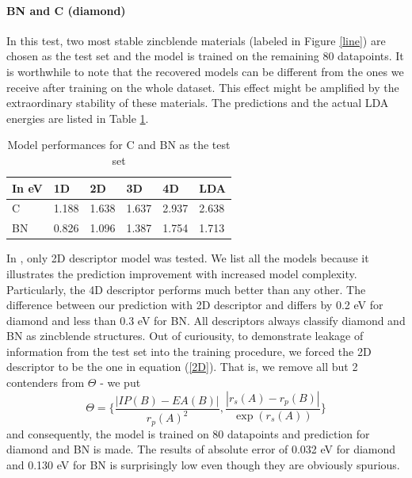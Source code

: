 \documentclass[11pt,oneside,czech,american]{book} %
\theoremstyle{definition} %
\theoremstyle{definition}
\begin{document}
\paragraph{BN and C (diamond)}
In this test, two most stable zincblende materials (labeled in Figure \ref{line}) are chosen as the test set and the model is trained on the remaining 80 datapoints. It is worthwhile to note that the recovered models can be different from the ones we receive after training on the whole dataset. This effect might be amplified by the extraordinary stability of these materials. The predictions and the actual LDA energies are listed in Table \ref{C_BN}.
\begin{table}[H]
	\centering
	\begin{tabular}{llllll} 
		\hline
		In eV & 1D    & 2D    & 3D    & 4D    & LDA    \\ 
		\hline
		C     & 1.188 & 1.638 & 1.637 & 2.937 & 2.638  \\ 		
		BN    & 0.826 & 1.096 & 1.387 & 1.754 & 1.713  \\
		\hline
	\end{tabular}
	\caption{Model performances for C and BN as the test set}
	\label{C_BN}
\end{table}
In \parencite{ghiringhelli17}, only 2D descriptor model was tested. We list all the models because it illustrates the prediction improvement with increased model complexity. Particularly, the 4D descriptor performs much better than any other. The difference between our prediction with 2D descriptor and \parencite{ghiringhelli17} differs by 0.2 eV for diamond and less than 0.3 eV for BN. All descriptors always classify diamond and BN as zincblende structures.
Out of curiousity, to demonstrate leakage of information from the test set into the training procedure, we forced the 2D descriptor to be the one in equation (\ref{2D}). That is, we remove all but 2 contenders from $\Theta$ - we put $$\Theta = \Big\{ \frac{|IP(B)-EA(B)|}{r_p(A)^2}, \frac{|r_s(A)-r_p(B)|}{\exp(r_s(A))} \Big\}$$ and consequently, the model is trained on 80 datapoints and prediction for diamond and BN is made. The results of absolute error of 0.032 eV for diamond and 0.130 eV for BN is surprisingly low even though they are obviously spurious.
\end{document}
